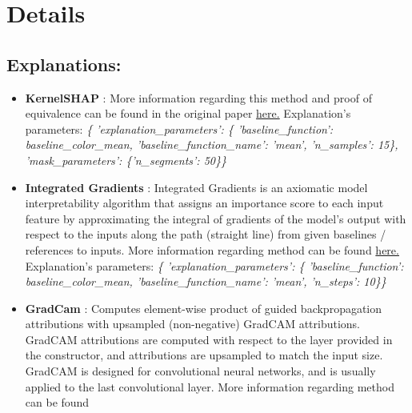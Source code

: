 \documentclass{article}%
\begin{document}
%
\newpage%
\section*{Details}%
\label{sec:Details}%
\subsection*{Explanations:}%
\label{subsec:Explanations}%
\begin{itemize}%
\item%
\textbf{KernelSHAP}%
: More information regarding this method and proof of equivalence can be found in the original paper %
\href{https://arxiv.org/abs/1705.07874}{here.}%
\newline%
%
Explanation's parameters: \newline%
%
\textit{\{   'explanation\_parameters': \{   'baseline\_function': baseline\_color\_mean,\newline%
                                  'baseline\_function\_name': 'mean',\newline%
                                  'n\_samples': 15\},\newline%
    'mask\_parameters': \{'n\_segments': 50\}\} \newline%
}%
\item%
\textbf{Integrated Gradients}%
: Integrated Gradients is an axiomatic model interpretability algorithm that assigns an importance score to each input feature by approximating the integral of gradients of the model’s output with respect to the inputs along the path (straight line) from given baselines / references to inputs. More information regarding method can be found %
\href{https://arxiv.org/abs/1703.01365}{here.}%
\newline%
%
Explanation's parameters: \newline%
%
\textit{\{   'explanation\_parameters': \{   'baseline\_function': baseline\_color\_mean,\newline%
                                  'baseline\_function\_name': 'mean',\newline%
                                  'n\_steps': 10\}\} \newline%
}%
\item%
\textbf{GradCam}%
:  Computes element{-}wise product of guided backpropagation attributions with upsampled (non{-}negative) GradCAM attributions. GradCAM attributions are computed with respect to the layer provided in the constructor, and attributions are upsampled to match the input size. GradCAM is designed for convolutional neural networks, and is usually applied to the last convolutional layer. More information regarding method can be found %

\end{itemize}
\end{document}

